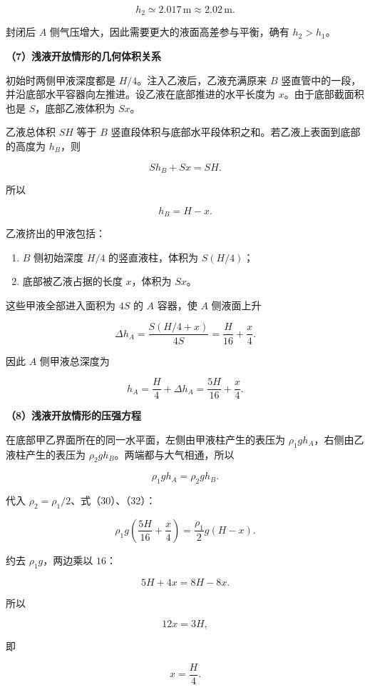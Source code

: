 \documentclass[12pt,a4paper,UTF8]{ctexart}
\newcommand{\tightlist}{\setlength{\itemsep}{0pt}\setlength{\parskip}{0pt}}
\begin{document}
\[
\boxed{h_2\simeq2.017\,\mathrm m\approx2.02\,\mathrm m}.
\tag{29}
\]

封闭后 \(A\) 侧气压增大，因此需要更大的液面高差参与平衡，确有
\(h_2>h_1\)。

\textbf{（7）浅液开放情形的几何体积关系}

初始时两侧甲液深度都是 \(H/4\)。注入乙液后，乙液充满原来 \(B\)
竖直管中的一段，并沿底部水平容器向左推进。设乙液在底部推进的水平长度为
\(x\)。由于底部截面积也是 \(S\)，底部乙液体积为 \(Sx\)。

乙液总体积 \(SH\) 等于 \(B\)
竖直段体积与底部水平段体积之和。若乙液上表面到底部的高度为 \(h_B\)，则

\[
Sh_B+Sx=SH.
\]

所以

\[
\boxed{h_B=H-x}.
\tag{30}
\]

乙液挤出的甲液包括：

\begin{enumerate}
\def\labelenumi{\arabic{enumi}.}
\tightlist
\item
  \(B\) 侧初始深度 \(H/4\) 的竖直液柱，体积为 \(S(H/4)\)；
\item
  底部被乙液占据的长度 \(x\)，体积为 \(Sx\)。
\end{enumerate}

这些甲液全部进入面积为 \(4S\) 的 \(A\) 容器，使 \(A\) 侧液面上升

\[
\Delta h_A
=\frac{S(H/4+x)}{4S}
=\frac H{16}+\frac x4.
\tag{31}
\]

因此 \(A\) 侧甲液总深度为

\[
\boxed{
h_A=\frac H4+\Delta h_A
=\frac{5H}{16}+\frac x4
}.
\tag{32}
\]

\textbf{（8）浅液开放情形的压强方程}

在底部甲乙界面所在的同一水平面，左侧由甲液柱产生的表压为
\(\rho_1gh_A\)，右侧由乙液柱产生的表压为
\(\rho_2gh_B\)。两端都与大气相通，所以

\[
\rho_1gh_A=\rho_2gh_B.
\tag{33}
\]

代入 \(\rho_2=\rho_1/2\)、式（30）、（32）：

\[
\rho_1g\left(\frac{5H}{16}+\frac x4\right)
=\frac{\rho_1}{2}g(H-x).
\]

约去 \(\rho_1g\)，两边乘以 \(16\)：

\[
5H+4x=8H-8x.
\]

所以

\[
12x=3H,
\]

即

\[
\boxed{x=\frac H4}.
\tag{34}
\]
\end{document}
